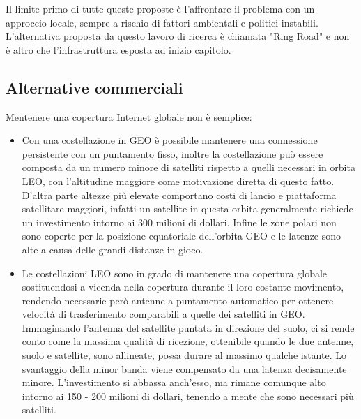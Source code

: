 \documentclass[12pt,a4paper,oneside]{book}
\begin{document}
			Il limite primo di tutte queste proposte è l'affrontare il problema con un approccio locale, sempre a rischio di fattori ambientali e politici instabili. L'alternativa proposta da questo lavoro di ricerca è chiamata "Ring Road" \cite{burleigh2011toward} e non è altro che l'infrastruttura esposta ad inizio capitolo.
		
		\subsection{Alternative commerciali}
		Mentenere una copertura Internet globale non è semplice:
		\begin{itemize}
			\item Con una costellazione in GEO è possibile mantenere una connessione persistente con un puntamento fisso, inoltre la costellazione può essere composta da un numero minore di satelliti rispetto a quelli necessari in orbita LEO, con l'altitudine maggiore come motivazione diretta di questo fatto.
			D'altra parte altezze più elevate comportano costi di lancio e piattaforma satellitare maggiori, infatti un satellite in questa orbita generalmente richiede un investimento intorno ai 300 milioni di dollari. Infine le zone polari non sono coperte per la posizione equatoriale dell'orbita GEO e le latenze sono alte a causa delle grandi distanze in gioco.
			
			\item Le costellazioni LEO sono in grado di mantenere una copertura globale sostituendosi a vicenda nella copertura durante il loro costante movimento, rendendo necessarie però antenne a puntamento automatico per ottenere velocità di trasferimento comparabili a quelle dei satelliti in GEO. Immaginando l'antenna del satellite puntata in direzione del suolo, ci si rende conto come la massima qualità di ricezione, ottenibile quando le due antenne, suolo e satellite, sono allineate, possa durare al massimo qualche istante. Lo svantaggio della minor banda viene compensato da una latenza decisamente minore. L'investimento si abbassa anch'esso, ma rimane comunque alto intorno ai 150 - 200 milioni di dollari, tenendo a mente che sono necessari più satelliti.
		\end{itemize}
		
\end{document}
